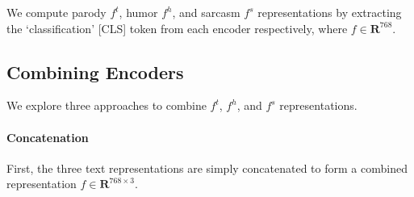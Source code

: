 \documentclass[11pt]{article}
\begin{document}
We compute parody $f^t$, humor $f^h$, and sarcasm $f^s$ representations by extracting the `classification' [CLS] token from each encoder respectively, where $f \in \mathbf{R}^{768}$.





\subsection{Combining Encoders}

We explore three approaches to combine $f^t$, $f^h$, and $f^s$ representations.

\paragraph{Concatenation} First, the three text representations are simply concatenated to form a combined representation $f \in \mathbf{R}^{768\times3}$. 
\end{document}
